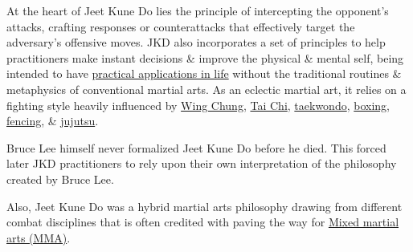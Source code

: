 \documentclass{article}
\begin{document}
At the heart of Jeet Kune Do lies the principle of intercepting the opponent's attacks, crafting responses or counterattacks that effectively target the adversary's offensive moves. JKD also incorporates a set of principles to help practitioners make instant decisions \& improve the physical \& mental self, being intended to have \href{https://en.wikipedia.org/wiki/Aliveness}{practical applications in life} without the traditional routines \& metaphysics of conventional martial arts. As an eclectic martial art, it relies on a fighting style heavily influenced by \href{https://en.wikipedia.org/wiki/Wing_Chun}{Wing Chung}, \href{https://en.wikipedia.org/wiki/Tai_Chi}{Tai Chi}, \href{https://en.wikipedia.org/wiki/Taekwondo}{taekwondo}, \href{https://en.wikipedia.org/wiki/Boxing}{boxing}, \href{https://en.wikipedia.org/wiki/Fencing}{fencing}, \& \href{https://en.wikipedia.org/wiki/Jujutsu}{jujutsu}.

{\sc Bruce Lee} himself never formalized Jeet Kune Do before he died. This forced later JKD practitioners to rely upon their own interpretation of the philosophy created by {\sc Bruce Lee}.

Also, Jeet Kune Do was a hybrid martial arts philosophy drawing from different combat disciplines that is often credited with paving the way for \href{https://en.wikipedia.org/wiki/Mixed_martial_arts_(MMA)}{Mixed martial arts (MMA)}.
\end{document}

